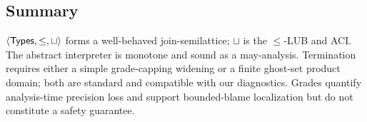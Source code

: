 \subsection{Summary}
$\langle\mathsf{Types},\le,\sqcup\rangle$ forms a well-behaved join-semilattice; $\sqcup$ is the $\le$-LUB and ACI.
The abstract interpreter is monotone and sound as a may-analysis.
Termination requires either a simple grade-capping widening or a finite ghost-set product domain; both are standard and compatible with our diagnostics.
Grades quantify analysis-time precision loss and support bounded-blame localization but do not constitute a safety guarantee.
